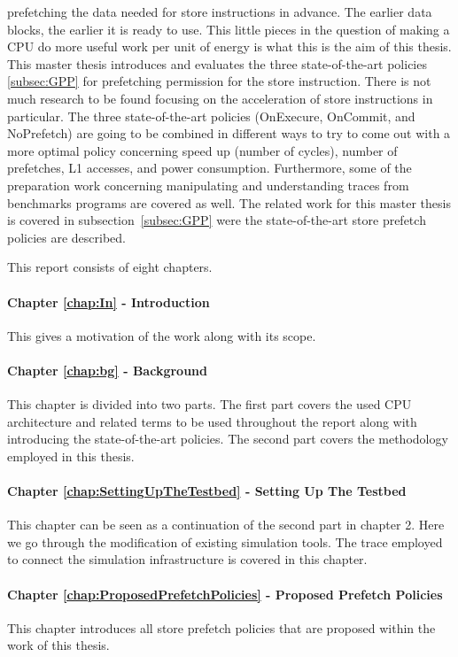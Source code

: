 prefetching the data needed for store instructions in advance. The earlier data blocks, the earlier it is ready to use. This little pieces in the question of making
a CPU do more useful work per unit of energy is what this is the aim of this thesis.
This master thesis introduces and evaluates the three state-of-the-art policies \ref{subsec:GPP} for prefetching permission
for the store instruction. There is not much research to be found focusing on
the acceleration of store instructions in particular. The three state-of-the-art policies (OnExecure, OnCommit, and NoPrefetch) are going to be combined in different ways to try to come out with a more optimal policy concerning
speed up (number of cycles), number of prefetches, L1 accesses, and power consumption. Furthermore, some of the preparation work
concerning manipulating and understanding traces from benchmarks programs are covered as well.
The related work for this master thesis is covered in subsection~\ref{subsec:GPP} were the state-of-the-art store prefetch policies are described.



This report consists of eight chapters. 
\paragraph{Chapter \ref{chap:In} - Introduction} This gives a motivation of the work along with its scope. 
\paragraph{Chapter \ref{chap:bg} - Background} This chapter is divided into two parts. The first part covers
the used CPU architecture and related terms to be used throughout the report along with introducing the state-of-the-art policies. The second part covers the methodology employed in this thesis.
\paragraph{Chapter \ref{chap:SettingUpTheTestbed} - Setting Up The Testbed} This chapter can be seen as a continuation of the
second part in chapter 2. Here we go through the modification of existing simulation tools. The trace employed to connect the simulation infrastructure
is covered in this chapter.
\paragraph{Chapter \ref{chap:ProposedPrefetchPolicies} - Proposed Prefetch Policies} This chapter introduces all store prefetch policies
that are proposed within the work of this thesis.
